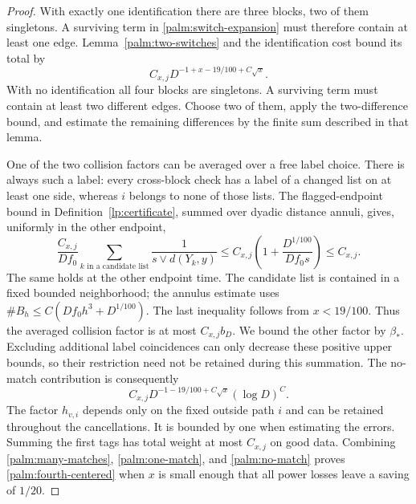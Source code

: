 \begin{proof}
With exactly one identification there are three blocks, two of them
singletons.  A surviving term in \eqref{palm:switch-expansion} must
therefore contain at least one edge.  Lemma~\ref{palm:two-switches}
and the identification cost bound its total by
\begin{equation}\label{palm:one-match}
                     C_{x,j}D^{-1+x-19/100+C\sqrt x}.
\end{equation}
With no identification all four blocks are singletons.  A surviving
term must contain at least two different edges.  Choose two of them,
apply the two-difference bound, and estimate the remaining differences
by the finite sum described in that lemma.

One of the two collision factors can be averaged over a free label
choice.  There is always such a label: every cross-block check has a
label of a changed list on at least one side, whereas $i$ belongs to
none of those lists.  The flagged-endpoint bound in
Definition~\ref{lp:certificate}, summed over dyadic distance annuli,
gives, uniformly in the other endpoint,
\begin{equation}\label{palm:averaged-beta}
 \frac{C_{x,j}}{Df_0}\sum_{k\text{ in a candidate list}}
       \frac1{s\vee d(Y_k,y)}
 \le C_{x,j}\left(1+\frac{D^{1/100}}{Df_0s}\right)\le C_{x,j}.
\end{equation}
The same holds at the other endpoint time.  The candidate list is
contained in a fixed bounded neighborhood; the annulus estimate uses
$\#B_h\le C(Df_0h^3+D^{1/100})$.  The last inequality follows from
$x<19/100$.  Thus the averaged collision factor is at most $C_{x,j}b_D$.
We bound the other factor by $\beta_*$.  Excluding additional label
coincidences can only decrease these positive upper bounds, so their
restriction need not be retained during this summation.  The no-match
contribution is consequently
\begin{equation}\label{palm:no-match}
                       C_{x,j}D^{-1-19/100+C\sqrt x}(\log D)^C.
\end{equation}
The factor $h_{v,i}$ depends only on the fixed outside path $i$ and
can be retained throughout the cancellations.  It is bounded by one
when estimating the errors.  Summing the first tags has total weight
at most $C_{x,j}$ on good data.  Combining \eqref{palm:many-matches},
\eqref{palm:one-match}, and \eqref{palm:no-match} proves
\eqref{palm:fourth-centered} when $x$ is small enough that all power
losses leave a saving of $1/20$.
\end{proof}

